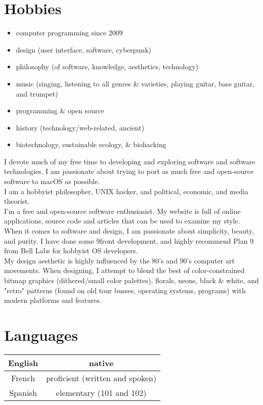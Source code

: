 \documentclass[11pt]{article}
\begin{document}
\section*{Hobbies}
\begin{itemize}
	\item computer programming since 2009
    \item design (user interface, software, cyberpunk)
    \item philosophy (of software, knowledge, aesthetics, technology)
    \item music (singing, listening to all genres \& varieties, playing guitar, bass guitar, and trumpet)
    \item programming \& open source
    \item history (technology/web-related, ancient)
    \item biotechnology, sustainable ecology, \& biohacking
\end{itemize}

I devote much of my free time to developing and exploring software and software technologies. I am passionate about trying to port as much free and open-source software to macOS as possible.\\

I am a hobbyist philosopher, UNIX hacker, and political, economic, and media theorist.\\

I'm a free and open-source software enthusiasist. My website is full of online applications, source code and articles that can be used to examine my style.\\

When it comes to software and design, I am passionate about simplicity, beauty, and purity. I have done some 9front development, and highly recommend Plan 9 from Bell Labs for hobbyist OS developers.\\

My design aesthetic is highly influenced by the 80's and 90's computer art movements. When designing, I attempt to blend the best of color-constrained bitmap graphics (dithered/small color palettes), florals, neons, black \& white, and "retro" patterns (found on old tour busses, operating systems, programs) with modern platforms and features. 

\section*{Languages}
\begin{tabular}{ | c | c | }
	\hline
	English & native  \\ 
	\hline
	French & proficient (written and spoken) \\  
	\hline
	Spanish & elementary (101 and 102) \\
	\hline
\end{tabular}
\end{document}
